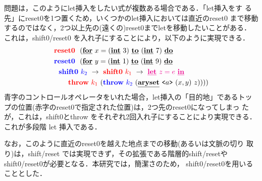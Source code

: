 問題は，このようにlet挿入をしたい式が複数ある場合である．「let挿入をす
る先」にreset0を1つ置くため，いくつかのlet挿入においては直近のreset0
まで移動するのではなく，2つ以上先の(遠くの)reset0までletを移動したいことがある．
これは，shift0/reset0 を入れ子にすることにより，以下のように実現できる．
\begin{align*}
  &\red{\Resetz} ~~(\cforin{x=(\cint~3)}{(\cint~7)} \\
  &\blue{\Resetz} ~~(\cforin{y=(\cint~1)}{(\cint~9)} \\
  &~~\blue{\Shiftz}~\blue{k_2}~\to~ \red{\Shiftz}~\red{k_1}~\to~ \magenta{\cLet~z=e~\cIn} \\
  &~~~~~~
    \red{\Throw}~\red{k_1}~(\blue{\Throw}~\blue{k_2}~(\caryset{\code{a}}{(x,y)}{z}))))
\end{align*}
青字のコントロールオペレータをいれた場合，let挿入の「目的地」であるトッ
プの位置(赤字のreset0で指定された位置)は，2つ先のreset0になってしまっ
たが，これは，shift0とthrow をそれぞれ2回入れ子にすることにより実現できる．
これが多段階 let 挿入である．

なお，このように直近のreset0を越えた地点までの移動(あるいは文脈の切り
取り)は，shift/reset では実現できず，その拡張である階層的shift/resetや
shift0/reset0が必要となる．本研究では，簡潔さのため，
shift0/reset0を用いることとした．

